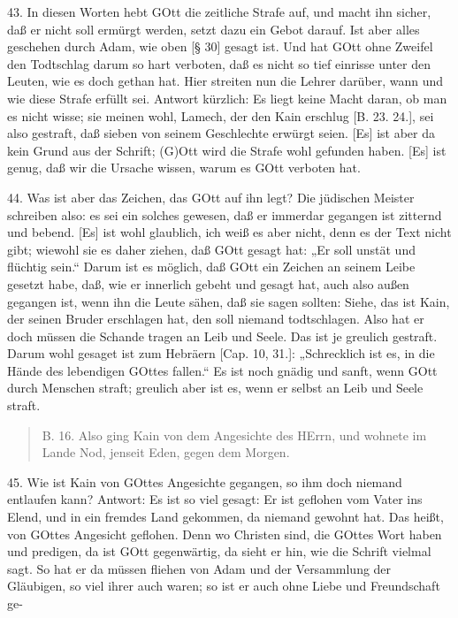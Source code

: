 43. In diesen Worten hebt GOtt die zeitliche Strafe auf, und macht ihn sicher, daß er nicht soll ermürgt werden, setzt dazu ein Gebot darauf.
Ist aber alles geschehen durch Adam, wie oben [§ 30] gesagt ist. Und hat GOtt ohne Zweifel den Todtschlag darum so hart verboten, daß es nicht so tief einrisse unter den Leuten, wie es doch gethan hat. Hier streiten nun die Lehrer darüber, wann und wie diese Strafe erfüllt sei. Antwort kürzlich: Es liegt keine Macht daran, ob man es nicht wisse; sie meinen wohl, Lamech, der den Kain erschlug [B. 23. 24.], sei also gestraft, daß sieben von seinem Geschlechte erwürgt seien. [Es] ist aber da kein Grund aus der Schrift; (G)Ott wird die Strafe wohl gefunden haben. [Es] ist genug, daß wir die Ursache wissen, warum es GOtt verboten hat.

44. Was ist aber das Zeichen, das GOtt auf ihn legt? Die jüdischen Meister schreiben also: es sei ein solches gewesen, daß er immerdar gegangen ist zitternd und bebend. [Es] ist wohl glaublich, ich weiß es aber nicht, denn es der Text nicht gibt; wiewohl sie es daher ziehen, daß GOtt gesagt hat: „Er soll unstät und flüchtig sein.“ Darum ist es möglich, daß GOtt ein Zeichen an seinem Leibe gesetzt habe, daß, wie er innerlich gebeht und gesagt hat, auch also außen gegangen ist, wenn ihn die Leute sähen, daß sie sagen sollten: Siehe, das ist Kain, der seinen Bruder erschlagen hat, den soll niemand todtschlagen. Also hat er doch müssen die Schande tragen an Leib und Seele. Das ist je greulich gestraft. Darum wohl gesaget ist zum Hebräern [Cap. 10, 31.]: „Schrecklich ist es, in die Hände des lebendigen GOttes fallen.“ Es ist noch gnädig und sanft, wenn GOtt durch Menschen straft; greulich aber ist es, wenn er selbst an Leib und Seele straft.

\begin{quote}
B. 16. Also ging Kain von dem Angesichte des HErrn, und wohnete im Lande Nod, jenseit Eden, gegen dem Morgen.
\end{quote}

45. Wie ist Kain von GOttes Angesichte gegangen, so ihm doch niemand entlaufen kann? Antwort: Es ist so viel gesagt: Er ist geflohen vom Vater ins Elend, und in ein fremdes Land gekommen, da niemand gewohnt hat. Das heißt, von GOttes Angesicht geflohen. Denn wo Christen sind, die GOttes Wort haben und predigen, da ist GOtt gegenwärtig, da sieht er hin, wie die Schrift vielmal sagt. So hat er da müssen fliehen von Adam und der Versammlung der Gläubigen, so viel ihrer auch waren; so ist er auch ohne Liebe und Freundschaft ge-

